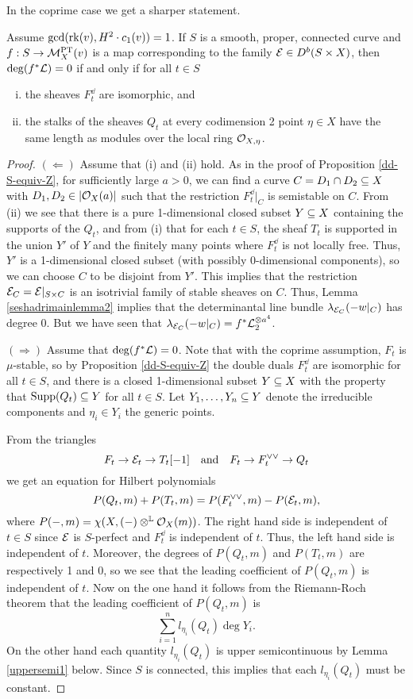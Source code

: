 In the coprime case we get a sharper statement. 
\begin{prop}\label{lengthconstant}
Assume $\gcd(\operatorname{\mathrm{rk}}(v), H^2 \cdot c_1(v)) = 1$. If $S$ is a smooth, proper, connected curve and $f: S \to \mathcal{M}^{\text{PT}}_X(v)$ is a map corresponding to the family $\mathcal{E} \in D^b(S \times X)$, then $\deg(f^*\mathcal{L}) = 0$ if and only if for all $t \in S$ 
\begin{enumerate}[(i)]
    \item the sheaves $F_t^\dd$ are isomorphic, and
    \item the stalks of the sheaves $Q_t$ at every codimension 2 point $\eta \in X$ have the same length as modules over the local ring $\mathcal{O}_{X,\eta}$.
\end{enumerate} 
\end{prop}
\begin{proof}
$(\Leftarrow)$ Assume that (i) and (ii) hold. As in the proof of Proposition \ref{dd-S-equiv-Z}, for sufficiently large $a > 0$, we can find a curve $C = D_1 \cap D_2 \subseteq X$ with $D_1, D_2 \in |\mathcal{O}_X(a)|$ such that the restriction $F_t^\dd|_C$ is semistable on $C$. From (ii) we see that there is a pure 1-dimensional closed subset $Y \subseteq X$ containing the supports of the $Q_t$, and from (i) that for each $t \in S$, the sheaf $T_t$ is supported in the union $Y'$ of $Y$ and the finitely many points where $F_t^\dd$ is not locally free. Thus, $Y'$ is a 1-dimensional closed subset (with possibly 0-dimensional components), so we can choose $C$ to be disjoint from $Y'$. This implies that the restriction $\mathcal{E}_C = \mathcal{E}|_{S \times C}$ is an isotrivial family of stable sheaves on $C$. Thus, Lemma \ref{seshadrimainlemma2} implies that the determinantal line bundle $\lambda_{\mathcal{E}_C}(-w|_C)$ has degree 0. But we have seen that $\lambda_{\mathcal{E}_C}(-w|_C) = f^*\mathcal{L}_2^{\otimes a^4}$.

$(\Rightarrow)$ Assume that $\deg(f^*\mathcal{L}) = 0$. Note that with the coprime assumption, $F_t$ is $\mu$-stable, so by Proposition \ref{dd-S-equiv-Z} the double duals $F_t^\dd$ are isomorphic for all $t \in S$, and there is a closed 1-dimensional subset $Y \subseteq X$ with the property that $\operatorname{\mathrm{Supp}}(Q_t) \subseteq Y$ for all $t \in S$. Let $Y_1, \ldots, Y_n \subseteq Y$ denote the irreducible components and $\eta_i \in Y_i$ the generic points. 

From the triangles
\[ F_t \to \mathcal{E}_t \to T_t[-1] \quad \text{and} \quad F_t \to F_t^{\vee\vee} \to Q_t \]
we get an equation for Hilbert polynomials
\[ P(Q_t, m) + P(T_t, m) = P(F_t^{\vee\vee}, m) - P(\mathcal{E}_t, m), \]
where $P(-,m) = \chi(X, (-) \otimes^{\mathbb{L}} \mathcal{O}_X(m))$. The right hand side is independent of $t \in S$ since $\mathcal{E}$ is $S$-perfect and $F_t^\dd$ is independent of $t$. Thus, the left hand side is independent of $t$. Moreover, the degrees of $P(Q_t, m)$ and $P(T_t, m)$ are respectively 1 and 0, so we see that the leading coefficient of $P(Q_t, m)$ is independent of $t$. Now on the one hand it follows from the Riemann-Roch theorem that the leading coefficient of $P(Q_t, m)$ is 
\[ \sum_{i=1}^n l_{\eta_i}(Q_t) \deg Y_i. \]
On the other hand each quantity $l_{\eta_i}(Q_t)$ is upper semicontinuous by Lemma \ref{uppersemi1} below. Since $S$ is connected, this implies that each $l_{\eta_i}(Q_t)$ must be constant.
\end{proof}

